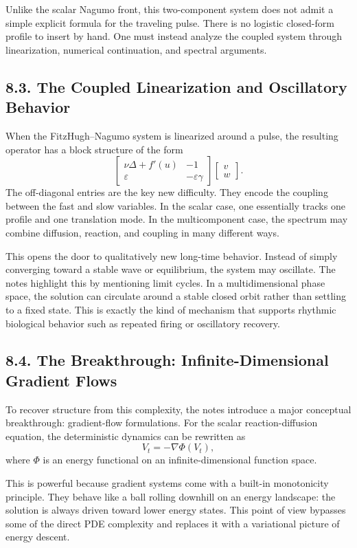 \documentclass[11pt]{article}
\theoremstyle{definition}
\theoremstyle{remark}
\begin{document}
Unlike the scalar Nagumo front, this two-component system does not admit a simple explicit formula for the traveling pulse. There is no logistic closed-form profile to insert by hand. One must instead analyze the coupled system through linearization, numerical continuation, and spectral arguments.

\subsection*{8.3. The Coupled Linearization and Oscillatory Behavior}
When the FitzHugh--Nagumo system is linearized around a pulse, the resulting operator has a block structure of the form
\[
\begin{bmatrix}
\nu\Delta+f'(u) & -1 \\
\varepsilon & -\varepsilon\gamma
\end{bmatrix}
\begin{bmatrix}
v\\
w
\end{bmatrix}.
\]
The off-diagonal entries are the key new difficulty. They encode the coupling between the fast and slow variables. In the scalar case, one essentially tracks one profile and one translation mode. In the multicomponent case, the spectrum may combine diffusion, reaction, and coupling in many different ways.

This opens the door to qualitatively new long-time behavior. Instead of simply converging toward a stable wave or equilibrium, the system may oscillate. The notes highlight this by mentioning limit cycles. In a multidimensional phase space, the solution can circulate around a stable closed orbit rather than settling to a fixed state. This is exactly the kind of mechanism that supports rhythmic biological behavior such as repeated firing or oscillatory recovery.

\subsection*{8.4. The Breakthrough: Infinite-Dimensional Gradient Flows}
To recover structure from this complexity, the notes introduce a major conceptual breakthrough: gradient-flow formulations. For the scalar reaction-diffusion equation, the deterministic dynamics can be rewritten as
\[
V_t=-\nabla\Phi(V_t),
\]
where \(\Phi\) is an energy functional on an infinite-dimensional function space.

This is powerful because gradient systems come with a built-in monotonicity principle. They behave like a ball rolling downhill on an energy landscape: the solution is always driven toward lower energy states. This point of view bypasses some of the direct PDE complexity and replaces it with a variational picture of energy descent.
\end{document}

